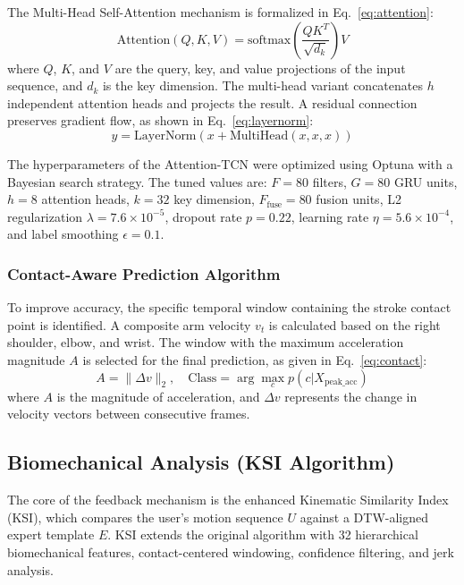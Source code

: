\documentclass[pdflatex,sn-mathphys-num]{sn-jnl}
\theoremstyle{thmstyleone}%
\theoremstyle{thmstyletwo}%
\theoremstyle{thmstylethree}%
\begin{document}
The Multi-Head Self-Attention mechanism is formalized in Eq.~\eqref{eq:attention}:
\begin{equation}
\text{Attention}(Q, K, V) = \text{softmax}\left(\frac{QK^T}{\sqrt{d_k}}\right) V
\label{eq:attention}
\end{equation}
\noindent where $Q$, $K$, and $V$ are the query, key, and value projections of the input sequence, and $d_k$ is the key dimension. The multi-head variant concatenates $h$ independent attention heads and projects the result. A residual connection preserves gradient flow, as shown in Eq.~\eqref{eq:layernorm}:
\begin{equation}
y = \text{LayerNorm}(x + \text{MultiHead}(x, x, x))
\label{eq:layernorm}
\end{equation}

The hyperparameters of the Attention-TCN were optimized using Optuna \cite{b41} with a Bayesian search strategy. The tuned values are: $F = 80$ filters, $G = 80$ GRU units, $h = 8$ attention heads, $k = 32$ key dimension, $F_{\text{fuse}} = 80$ fusion units, L2 regularization $\lambda = 7.6 \times 10^{-5}$, dropout rate $p = 0.22$, learning rate $\eta = 5.6 \times 10^{-4}$, and label smoothing $\epsilon = 0.1$.

\subsubsection{Contact-Aware Prediction Algorithm}
To improve accuracy, the specific temporal window containing the stroke contact point is identified. A composite arm velocity $v_t$ is calculated based on the right shoulder, elbow, and wrist. The window with the maximum acceleration magnitude $A$ is selected for the final prediction, as given in Eq.~\eqref{eq:contact}:
\begin{equation}
A = \|\Delta v\|_2, \quad \text{Class} = \arg\max_{c} p(c | X_{\text{peak\_acc}})
\label{eq:contact}
\end{equation}
\noindent where $A$ is the magnitude of acceleration, and $\Delta v$ represents the change in velocity vectors between consecutive frames.

\subsection{Biomechanical Analysis (KSI Algorithm)}



The core of the feedback mechanism is the enhanced Kinematic Similarity Index (KSI), which compares the user's motion sequence $U$ against a DTW-aligned expert template $E$. KSI extends the original algorithm with 32 hierarchical biomechanical features, contact-centered windowing, confidence filtering, and jerk analysis.
\end{document}
